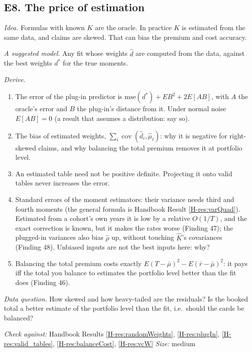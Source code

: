 \documentclass[10pt]{article}
\newcommand{\hb}[1]{\ref*{H-#1}}
\newcommand{\hmu}{\hat\mu}
\newcommand{\cov}{\operatorname{cov}}
\newcommand{\ext}[7]{%
  \subsection*{#1}
  \textit{Idea.} #2\par\smallskip
  \textit{A suggested model.} #3\par\smallskip
  \textit{Derive.}
  \begin{enumerate}\setlength{\itemsep}{1pt}\setlength{\parskip}{0pt}#4\end{enumerate}
  \textit{Data question.} #5\par\smallskip
  {\small\textit{Check against:} Handbook #6 \quad\textperiodcentered\quad \textit{Size:} #7}\par}
\begin{document}
\ext{E8. The price of estimation}
{Formulas with known $K$ are the oracle. In practice $K$ is estimated from the same data, and claims
are skewed. That can bias the premium and cost accuracy.}
{Any fit whose weights $\hat d$ are computed from the data, against the best weights $d^*$ for the
true moments.}
{\item The error of the plug-in predictor is $\mathrm{mse}(d^*) + EB^2 + 2E[AB]$, with $A$ the
   oracle's error and $B$ the plug-in's distance from it. Under normal noise $E[AB] = 0$ (a result
   that assumes a distribution: say so).
 \item The bias of estimated weights, $\sum_i \cov(\hat d_i, \hmu_i)$: why it is negative for
   right-skewed claims, and why balancing the total premium removes it at portfolio level.
 \item An estimated table need not be positive definite. Projecting it onto valid tables never
   increases the error.
 \item Standard errors of the moment estimators: their variance needs third and fourth moments
   (the general formula is Handbook Result \hb{res:varQuad}). Estimated from a cohort's own
   years it is low by a relative $O(1/T)$, and the exact correction is known, but it makes the rates
   worse (Finding 47); the plugged-in variances also bias $\hat\rho$ up, without touching $\hat K$'s
   covariances (Finding 48). Unbiased inputs are not the best inputs here: why?
 \item Balancing the total premium costs exactly $E(T - \bar\mu)^2 - E(\bar r - \bar\mu)^2$: it pays
   iff the total you balance to estimates the portfolio level better than the fit does (Finding 46).}
{How skewed and how heavy-tailed are the residuals? Is the booked total a better estimate of the
portfolio level than the fit, i.e.\ should the cards be balanced?}
{Results \hb{res:randomWeights}, \hb{res:plugIn}, \hb{res:valid_tables}, \hb{res:balanceCost},
\hb{res:vcW}}{medium}
\end{document}
